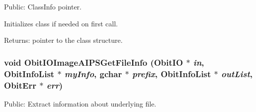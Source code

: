Public: Class\-Info pointer. 

Initializes class if needed on first call. \begin{Desc}
\item[Returns:]pointer to the class structure. \end{Desc}
\subsubsection{\setlength{\rightskip}{0pt plus 5cm}void Obit\-IOImage\-AIPSGet\-File\-Info ({\bf Obit\-IO} $\ast$ {\em in}, {\bf Obit\-Info\-List} $\ast$ {\em my\-Info}, gchar $\ast$ {\em prefix}, {\bf Obit\-Info\-List} $\ast$ {\em out\-List}, {\bf Obit\-Err} $\ast$ {\em err})}\label{ObitIOImageAIPS_8h_a21}


Public: Extract information about underlying file. 

